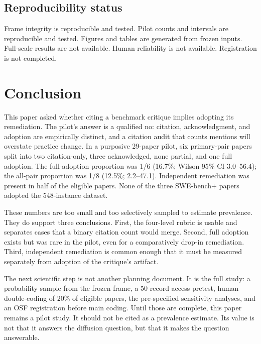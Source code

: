 \documentclass[11pt,a4paper]{article}
\begin{document}
\subsection{Reproducibility status}

Frame integrity is reproducible and tested. Pilot counts and intervals are reproducible and tested. Figures and tables are generated from frozen inputs. Full-scale results are not available. Human reliability is not available. Registration is not completed.

\section{Conclusion}

This paper asked whether citing a benchmark critique implies adopting its remediation. The pilot's answer is a qualified no: citation, acknowledgment, and adoption are empirically distinct, and a citation audit that counts mentions will overstate practice change. In a purposive 29-paper pilot, six primary-pair papers split into two citation-only, three acknowledged, none partial, and one full adoption. The full-adoption proportion was 1/6 (16.7\%; Wilson 95\% CI 3.0--56.4); the all-pair proportion was 1/8 (12.5\%; 2.2--47.1). Independent remediation was present in half of the eligible papers. None of the three SWE-bench+ papers adopted the 548-instance dataset.

These numbers are too small and too selectively sampled to estimate prevalence. They do support three conclusions. First, the four-level rubric is usable and separates cases that a binary citation count would merge. Second, full adoption exists but was rare in the pilot, even for a comparatively drop-in remediation. Third, independent remediation is common enough that it must be measured separately from adoption of the critique's artifact.

The next scientific step is not another planning document. It is the full study: a probability sample from the frozen frame, a 50-record access pretest, human double-coding of 20\% of eligible papers, the pre-specified sensitivity analyses, and an OSF registration before main coding. Until those are complete, this paper remains a pilot study. It should not be cited as a prevalence estimate. Its value is not that it answers the diffusion question, but that it makes the question answerable.
\end{document}
